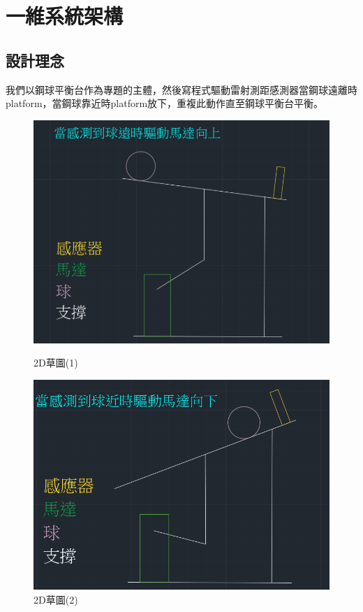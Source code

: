 \section{一維系統架構}

\subsection{設計理念}

我們以鋼球平衡台作為專題的主體，然後寫程式驅動雷射測距感測器當鋼球遠離時platform，當鋼球靠近時platform放下，重複此動作直至鋼球平衡台平衡。

\begin{figure}[h!]
    \centering
    \begin{minipage}[b]{0.45\textwidth}
        \centering
        \includegraphics[width=\textwidth,height=0.22\textheight]{./../images/螢幕擷取畫面 2024-05-22 181158.png}
        \caption{2D草圖(1)}
    \end{minipage}
    \hfill
    \begin{minipage}[b]{0.45\textwidth}
        \centering
        \includegraphics[width=\textwidth,height=0.22\textheight]{./../images/螢幕擷取畫面 2024-05-22 180925.png} 
        \caption{2D草圖(2)}
    \end{minipage}
\end{figure}

